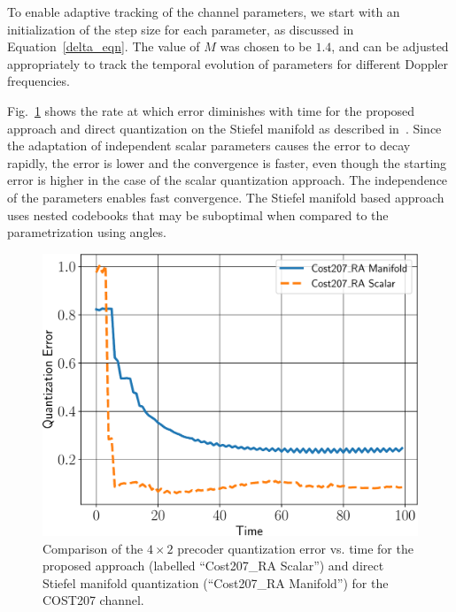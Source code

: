 \documentclass[journal,10pt,twocolumn]{IEEEtran}
\begin{document}
To enable adaptive tracking of the channel parameters, we start with
an initialization of the step size for each parameter, as discussed in
Equation~\ref{delta_eqn}. The value of $M$ was chosen to be $1.4$, and
can be adjusted appropriately to track the temporal evolution of
parameters for different Doppler frequencies.

Fig.~\ref{fig:error_decay} shows the rate at which error diminishes
with time for the proposed approach and direct quantization on the
Stiefel manifold as described in~\cite{Gupt1905:Predictive}. Since the
adaptation of independent scalar parameters causes the error to decay
rapidly, the error is lower and the convergence is faster, even though
the starting error is higher in the case of the scalar quantization
approach. The independence of the parameters enables fast
convergence. The Stiefel manifold based approach uses nested codebooks
that may be suboptimal when compared to the parametrization using
angles.

\begin{figure}
\begin{center}
\includegraphics[width=0.66\columnwidth]{images/qerror.pdf}
\caption{\label{fig:error_decay}Comparison of the $4\times 2$
  precoder quantization error vs. time for the proposed
  approach (labelled ``Cost207\_RA Scalar'') and direct Stiefel
  manifold quantization (``Cost207\_RA Manifold'') for the COST207 channel.}
\end{center}
\end{figure}
\end{document}
